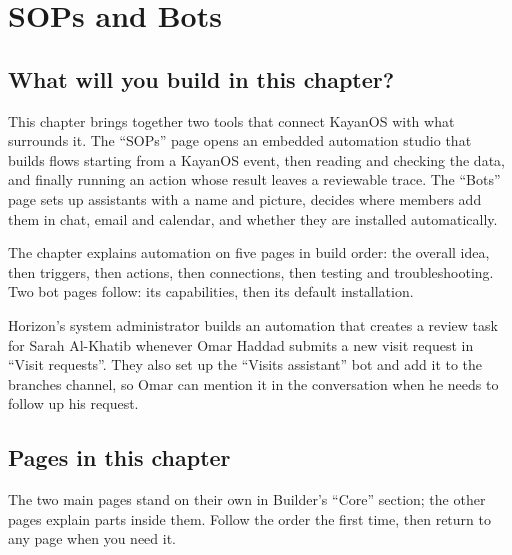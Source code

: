 \chapter{SOPs and Bots}
\label{ch:builder-automations}

\section{What will you build in this chapter?}
\label{sec:builder-automations-intro}

This chapter brings together two tools that connect KayanOS with what surrounds it. The “SOPs” page opens an embedded automation studio that builds flows starting from a KayanOS event, then reading and checking the data, and finally running an action whose result leaves a reviewable trace. The “Bots” page sets up assistants with a name and picture, decides where members add them in chat, email and calendar, and whether they are installed automatically.

The chapter explains automation on five pages in build order: the overall idea, then triggers, then actions, then connections, then testing and troubleshooting. Two bot pages follow: its capabilities, then its default installation.

\begin{rcnote}
Horizon's system administrator builds an automation that creates a review task for Sarah Al-Khatib whenever Omar Haddad submits a new visit request in “Visit requests”. They also set up the “Visits assistant” bot and add it to the branches channel, so Omar can mention it in the conversation when he needs to follow up his request.
\end{rcnote}

\section{Pages in this chapter}
\label{sec:builder-automations-pages}

The two main pages stand on their own in Builder's “Core” section; the other pages explain parts inside them. Follow the order the first time, then return to any page when you need it.

